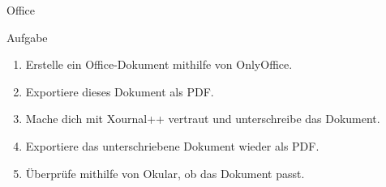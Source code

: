 \begin{frame}{Office}
    \vspace{0.5cm}
    \begin{alertblock}{Aufgabe}
        \begin{enumerate}
            \item Erstelle ein Office-Dokument mithilfe von OnlyOffice.\pause
            \item Exportiere dieses Dokument als PDF.\pause
            \item Mache dich mit Xournal++ vertraut und unterschreibe das Dokument.\pause
            \item Exportiere das unterschriebene Dokument wieder als PDF.\pause
            \item Überprüfe mithilfe von Okular, ob das Dokument passt.
        \end{enumerate}
    \end{alertblock}
\end{frame}